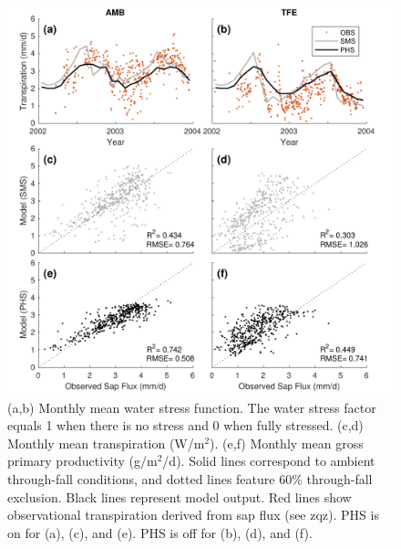\documentclass[draft,linenumbers]{agujournal}
\begin{document}
  \clearpage   
  \begin{figure}[h]
     \centering
     \includegraphics[width=30pc]{../figs3/T.pdf}
     \caption{(a,b) Monthly mean water stress function. The water stress factor equals 1 when there is no stress and 0 when fully stressed.
     (c,d) Monthly mean transpiration (W/m$^2$).
     (e,f) Monthly mean gross primary productivity (g/m$^2$/d). 
     Solid lines correspond to ambient through-fall conditions, and dotted lines feature 60\% through-fall exclusion.
     Black lines represent model output.
     Red lines show observational transpiration derived from sap flux (see zqz).
     PHS is on for (a), (c), and (e). PHS is off for (b), (d), and (f).
     }
     \label{fig:t}
  \end{figure}
\end{document}
